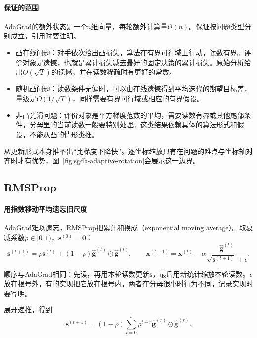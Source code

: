 \paragraph{保证的范围}
AdaGrad的额外状态是一个$n$维向量，每轮额外计算量$O(n)$。保证按问题类型分别成立，引用时要注明。

\begin{itemize}
 \item 凸在线问题：对手依次给出凸损失，算法在有界可行域上行动，读数有界。评价对象是遗憾，也就是累计损失减去最好的固定决策的累计损失。原始分析给出$O(\sqrt T)$的遗憾，并在读数稀疏时有更好的常数。
 \item 随机凸问题：读数条件无偏时，可以由在线遗憾得到平均迭代的期望目标差，量级是$O(1/\sqrt T)$，同样需要有界可行域或相应的有界假设。
 \item 非凸光滑问题：评价对象是平方梯度范数的平均，需要读数有界或其他尾部条件，分母里的当前读数一般要特别处理。这类结果依赖具体的算法形式和假设，不能从凸的情形类推。
\end{itemize}

从更新形式本身推不出“比梯度下降快”。逐坐标缩放只有在问题的难点与坐标轴对齐时才有优势，图~\ref{fig:sgdb-adaptive-rotation}会展示这一边界。

\subsection{RMSProp}
\label{sec:sgdb-rmsprop}

\paragraph{用指数移动平均遗忘旧尺度}
AdaGrad难以遗忘，RMSProp把累计和换成（exponential moving average）。取衰减系数$\rho\in[0,1)$，$\bm{s}^{(0)}=\bm{0}$：
\begin{equation}
 \bm{s}^{(t+1)}=\rho\bm{s}^{(t)}+(1-\rho)\hat{\bm g}^{(t)}\odot\hat{\bm g}^{(t)},\qquad
 \bm{x}^{(t+1)}=\bm{x}^{(t)}-\alpha\frac{\hat{\bm g}^{(t)}}{\sqrt{\bm{s}^{(t+1)}}+\epsilon}.
 \label{eq:sgdb-rmsprop}
\end{equation}

顺序与AdaGrad相同：先读，再用本轮读数更新$\bm{s}$，最后用新统计缩放本轮读数。$\epsilon$放在根号外，有的实现把它放在根号内，两者在分母很小时行为不同，记录实现时要写明。

展开递推，得到
\[
 \bm{s}^{(t+1)}=(1-\rho)\sum_{r=0}^{t}\rho^{t-r}\hat{\bm g}^{(r)}\odot\hat{\bm g}^{(r)}.
\]

